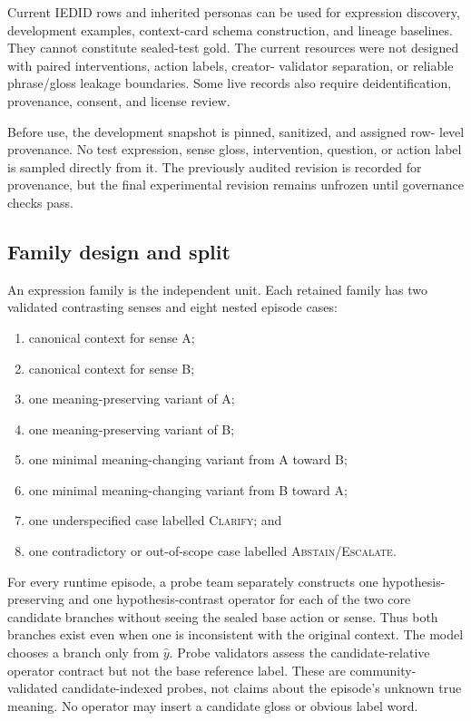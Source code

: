 \documentclass[preprint,12pt,authoryear]{elsarticle}
\newcommand{\clarify}{\ifmmode\operatorname{CLARIFY}\else\textsc{Clarify}\fi}
\newcommand{\abstain}{\ifmmode\operatorname{ABSTAIN}\else\textsc{Abstain/Escalate}\fi}
\begin{document}
Current IEDID rows and inherited personas can be used for expression
discovery, development examples, context-card schema construction, and
lineage baselines. They cannot constitute sealed-test gold. The current
resources were not designed with paired interventions, action labels, creator-
validator separation, or reliable phrase/gloss leakage boundaries. Some live
records also require deidentification, provenance, consent, and license review.

Before use, the development snapshot is pinned, sanitized, and assigned row-
level provenance. No test expression, sense gloss, intervention, question, or
action label is sampled directly from it. The previously audited revision is
recorded for provenance, but the final experimental revision remains unfrozen
until governance checks pass.

\subsection{Family design and split}

An expression family is the independent unit. Each retained family has two
validated contrasting senses and eight nested episode cases:

\begin{enumerate}[leftmargin=*]
\item canonical context for sense A;
\item canonical context for sense B;
\item one meaning-preserving variant of A;
\item one meaning-preserving variant of B;
\item one minimal meaning-changing variant from A toward B;
\item one minimal meaning-changing variant from B toward A;
\item one underspecified case labelled \clarify; and
\item one contradictory or out-of-scope case labelled \abstain.
\end{enumerate}

For every runtime episode, a probe team separately constructs one
hypothesis-preserving and one hypothesis-contrast operator for each of the two
core candidate branches without seeing the sealed base action or sense. Thus
both branches exist even when one is inconsistent with the original context.
The model chooses a branch only from $\hat y$. Probe validators assess the
candidate-relative operator contract but not the base reference label. These
are community-validated candidate-indexed probes, not claims about the
episode's unknown true meaning. No operator may insert a candidate gloss or
obvious label word.
\end{document}
